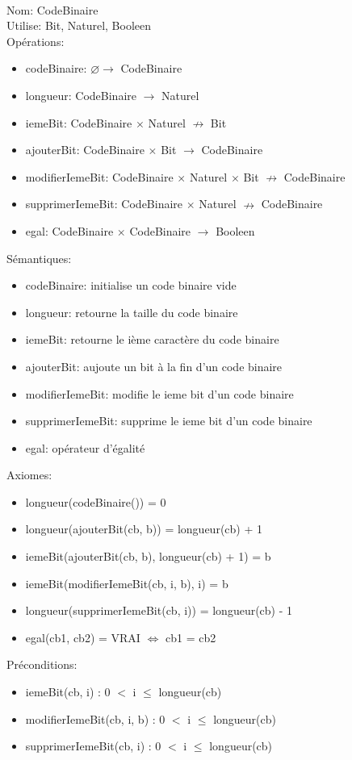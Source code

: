 \documentclass{article}
\begin{document}
    \noindent
    \thispagestyle{empty} \\
    Nom: CodeBinaire \\
    Utilise: Bit, Naturel, Booleen \\
    Opérations: \begin{itemize}[label=$\ $, leftmargin=2cm]
        \item codeBinaire: $ \varnothing \rightarrow $ CodeBinaire 
        \item longueur: CodeBinaire $ \rightarrow $ Naturel 
        \item iemeBit: CodeBinaire $ \times $ Naturel $ \nrightarrow $ Bit
        \item ajouterBit: CodeBinaire $ \times $ Bit $ \rightarrow $ CodeBinaire
        \item modifierIemeBit: CodeBinaire $ \times $ Naturel $ \times $ Bit $ \nrightarrow $ CodeBinaire
        \item supprimerIemeBit: CodeBinaire $ \times $ Naturel $ \nrightarrow $ CodeBinaire
        \item egal: CodeBinaire $ \times $ CodeBinaire $ \rightarrow $ Booleen 
    \end{itemize}

    Sémantiques: \begin{itemize}[label=$\ $, leftmargin=2cm]
        \item codeBinaire: initialise un code binaire vide
        \item longueur: retourne la taille du code binaire
        \item iemeBit: retourne le ième caractère du code binaire
        \item ajouterBit: aujoute un bit à la fin d'un code binaire
        \item modifierIemeBit: modifie le ieme bit d'un code binaire
        \item supprimerIemeBit: supprime le ieme bit d'un code binaire
        \item egal: opérateur d'égalité
    \end{itemize}

    Axiomes: \begin{itemize}[label=$\- $, leftmargin=2cm]
        \item longueur(codeBinaire()) = 0
        \item longueur(ajouterBit(cb, b)) = longueur(cb) + 1
        \item iemeBit(ajouterBit(cb, b), longueur(cb) + 1) = b
        \item iemeBit(modifierIemeBit(cb, i, b), i) = b
        \item longueur(supprimerIemeBit(cb, i)) = longueur(cb) - 1
        \item egal(cb1, cb2) = VRAI $ \Leftrightarrow $ cb1 = cb2
    \end{itemize}

    Préconditions: \begin{itemize}[label=$\- $, leftmargin=2cm]
        \item iemeBit(cb, i) : 0 $ < $ i $ \leq $ longueur(cb)
        \item modifierIemeBit(cb, i, b) : 0 $ < $ i $ \leq $ longueur(cb)
        \item supprimerIemeBit(cb, i) : 0 $ < $ i $ \leq $ longueur(cb)
    \end{itemize}
\end{document}
